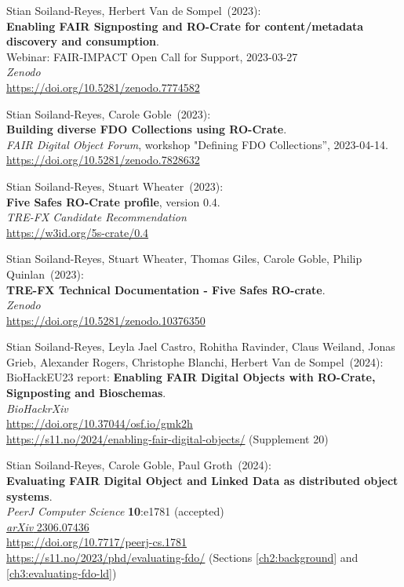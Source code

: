\begin{thebibliography}{9}
Stian Soiland-Reyes, Herbert Van de Sompel~(2023): \\
\textbf{Enabling FAIR Signposting and RO-Crate for content/metadata discovery and consumption}.\\
Webinar: FAIR-IMPACT Open Call for Support, 2023-03-27 \\
\emph{Zenodo} \\
\url{https://doi.org/10.5281/zenodo.7774582}

Stian Soiland-Reyes, Carole Goble~(2023): \\
\textbf{Building diverse FDO Collections using RO-Crate}.\\
\emph{FAIR Digital Object Forum}, workshop "Defining FDO Collections”, 2023-04-14.\\
\url{https://doi.org/10.5281/zenodo.7828632}

Stian Soiland-Reyes, Stuart Wheater~(2023): \\
\textbf{Five Safes RO-Crate profile}, version 0.4.\\
\emph{TRE-FX Candidate Recommendation} \\
\url{https://w3id.org/5s-crate/0.4}

Stian Soiland-Reyes, Stuart Wheater, Thomas Giles, Carole Goble, Philip Quinlan~(2023):\\  \textbf{TRE-FX Technical Documentation - Five Safes RO-crate}.  \\
\emph{Zenodo} \\
\url{https://doi.org/10.5281/zenodo.10376350}

Stian Soiland-Reyes, Leyla Jael Castro, Rohitha Ravinder, Claus Weiland, Jonas Grieb, Alexander Rogers, Christophe Blanchi, Herbert Van de Sompel~(2024): \\
BioHackEU23 report: \textbf{Enabling FAIR Digital Objects with RO-Crate, Signposting and Bioschemas}. \\
\emph{BioHackrXiv} \\
\url{https://doi.org/10.37044/osf.io/gmk2h}\\
\url{https://s11.no/2024/enabling-fair-digital-objects/} (Supplement 20)


Stian Soiland-Reyes, Carole Goble, Paul Groth~(2024): \\
\textbf{Evaluating FAIR Digital Object and Linked Data as distributed object systems}.\\
\emph{PeerJ Computer Science} \textbf{10}:e1781 (accepted) \\
\href{https://doi.org/10.48550/arXiv.2306.07436}{\emph{arXiv} 2306.07436} \\
\url{https://doi.org/10.7717/peerj-cs.1781} \\
\url{https://s11.no/2023/phd/evaluating-fdo/} 
(Sections \vref{ch2:background} and \vref{ch3:evaluating-fdo-ld})


\end{thebibliography}

